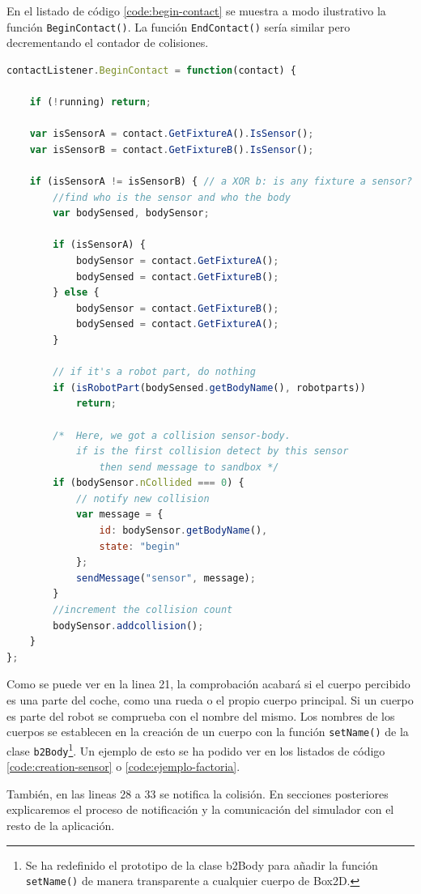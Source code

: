 En el listado de código \ref{code:begin-contact} se muestra a modo ilustrativo la función \texttt{BeginContact()}. La función \texttt{EndContact()} sería similar pero decrementando el contador de colisiones.


\begin{lstlisting}[language={Javascript},label={code:begin-contact}, caption={Función \texttt{BeginContact()} definida para los sensores.}]
contactListener.BeginContact = function(contact) {

	if (!running) return;

	var isSensorA = contact.GetFixtureA().IsSensor();
	var isSensorB = contact.GetFixtureB().IsSensor();

	if (isSensorA != isSensorB) { // a XOR b: is any fixture a sensor?
		//find who is the sensor and who the body
		var bodySensed, bodySensor;

		if (isSensorA) {
			bodySensor = contact.GetFixtureA();
			bodySensed = contact.GetFixtureB();
		} else {
			bodySensor = contact.GetFixtureB();
			bodySensed = contact.GetFixtureA();
		}

		// if it's a robot part, do nothing
		if (isRobotPart(bodySensed.getBodyName(), robotparts))
			return;

		/*  Here, we got a collision sensor-body.
			if is the first collision detect by this sensor
				then send message to sandbox */
		if (bodySensor.nCollided === 0) {
			// notify new collision
			var message = {
				id: bodySensor.getBodyName(),
				state: "begin"
			};
			sendMessage("sensor", message);
		}
		//increment the collision count
		bodySensor.addcollision();
	}
};
\end{lstlisting}

Como se puede ver en la linea 21, la comprobación acabará si el cuerpo percibido es una parte del coche, como una rueda o el propio cuerpo principal. Si un cuerpo es parte del robot se comprueba con el nombre del mismo. Los nombres de los cuerpos se establecen en la creación de un cuerpo con la función \texttt{setName()} de la clase \texttt{b2Body}\footnote{Se ha redefinido el prototipo de la clase b2Body para añadir la función \texttt{setName()} de manera transparente a cualquier cuerpo de Box2D.}. Un ejemplo de esto se ha podido ver en los listados de código \ref{code:creation-sensor} o \ref{code:ejemplo-factoria}.

También, en las lineas 28 a 33 se notifica la colisión. En secciones posteriores explicaremos el proceso de notificación y la comunicación del simulador con el resto de la aplicación.



